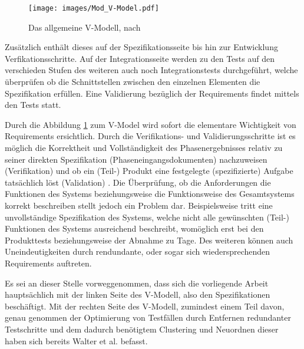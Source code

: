 \begin{figure}
	\centering
	\texttt{[image: images/Mod\_V-Model.pdf]}
	\caption{Das allgemeine V-Modell, nach \cite{SL05}}
	\label{img:Mod_V-Model}
\end{figure}
Zusätzlich enthält dieses auf der Spezifikationsseite bis hin zur Entwicklung Verfikationsschritte. Auf der Integrationsseite werden zu den Tests auf den verschieden Stufen des weiteren auch noch Integrationstests durchgeführt, welche überprüfen ob die Schnittstellen zwischen den einzelnen Elementen die Spezifikation erfüllen. Eine Validierung bezüglich der Requirements findet mittels den Tests statt.

Durch die Abbildung \ref{img:Mod_V-Model} zum V-Model wird sofort die elementare Wichtigkeit von Requirements ersichtlich. Durch die Verifikations- und Validierungsschritte ist es möglich die Korrektheit und Vollständigkeit des Phasenergebnisses relativ zu seiner direkten Spezifikation (Phaseneingangsdokumenten) nachzuweisen (Verifikation) \cite{SL05} und ob ein (Teil-) Produkt eine festgelegte (spezifizierte) Aufgabe tatsächlich löst (Validation) \cite{SL05}. Die Überprüfung, ob die Anforderungen die Funktionen des Systems beziehungsweise die Funktionsweise des Gesamtsystems korrekt beschreiben stellt jedoch ein Problem dar. Beispielsweise tritt eine unvollständige Spezifikation des Systems, welche nicht alle gewünschten (Teil-) Funktionen des Systems ausreichend beschreibt, womöglich erst bei den Produkttests beziehungsweise der Abnahme zu Tage.  Des weiteren können auch Uneindeutigkeiten durch rendundante, oder sogar sich wiedersprechenden Requirements auftreten.

Es sei an dieser Stelle vorweggenommen, dass sich die vorliegende Arbeit hauptsächlich mit der linken Seite des V-Modell, also den Spezifikationen beschäftigt. Mit der rechten Seite des V-Modell, zumindest einem Teil davon, genau genommen der Optimierung von Testfällen durch Entfernen redundanter Testschritte und dem dadurch benötigtem Clustering und Neuordnen dieser haben sich bereits Walter et al. \cite{WSPR17} befasst.

